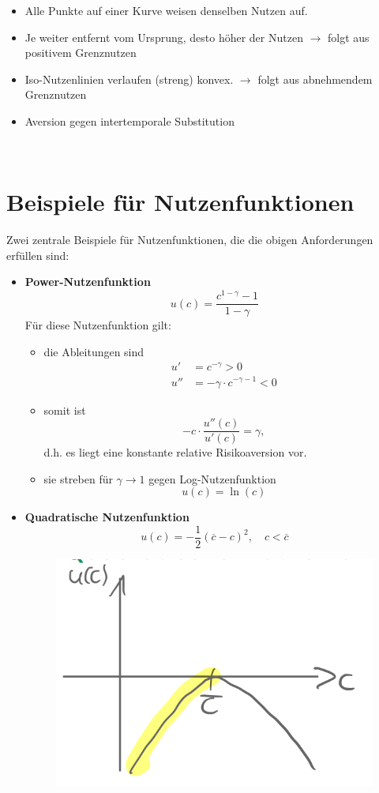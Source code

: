 \documentclass[12pt]{extreport} %
\theoremstyle{named}
\theoremstyle{nnamed}
\theoremstyle{itshape}
\theoremstyle{normal}
\begin{document}
\begin{itemize}
	\item Alle Punkte auf einer Kurve weisen denselben Nutzen auf.
	\item Je weiter entfernt vom Ursprung, desto höher der Nutzen $\rightarrow$ folgt aus positivem Grenznutzen
	\item Iso-Nutzenlinien verlaufen (streng) konvex. $\rightarrow$ folgt aus abnehmendem Grenznutzen
	\item Aversion gegen intertemporale Substitution
\end{itemize}

~\newpage

\section{Beispiele für Nutzenfunktionen}
Zwei zentrale Beispiele für Nutzenfunktionen, die die obigen Anforderungen erfüllen sind:
\begin{itemize}
	\item \textbf{Power-Nutzenfunktion}
			$$ u(c) = \frac{c^{1-\gamma} - 1}{1 - \gamma} $$
			Für diese Nutzenfunktion gilt:
		\begin{itemize}
			\item die Ableitungen sind
				\begin{align*}
					u' & = c^{-\gamma} > 0 \\
					u'' & = - \gamma \cdot c ^{-\gamma - 1} < 0
				\end{align*}
			\item somit ist
				$$- c \cdot \frac{u''(c)}{u'(c)} = \gamma, $$
				d.h. es liegt eine konstante relative Risikoaversion vor.
			\item sie streben für $\gamma \rightarrow 1$ gegen Log-Nutzenfunktion
		$$ u(c) = \ln(c) $$
		\end{itemize}
	\item \textbf{Quadratische Nutzenfunktion}
			$$ u(c) = - \frac{1}{2} \left( \overline{c} - c \right)^2, \quad c < \overline{c} $$
			\begin{figure}[h!] \centering
				\includegraphics[scale=0.4]{img/p20}
			\end{figure}
\end{itemize}
\end{document}
